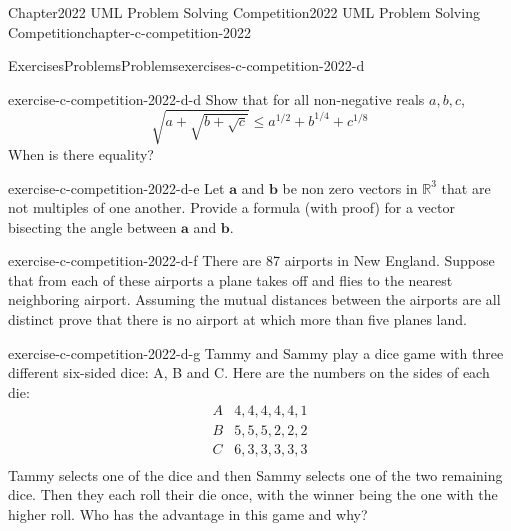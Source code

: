 \documentclass[oneside,10pt,]{book}
\numberwithin{equation}{section}
\providecommand\phantomsection{}
\newcommand{\RR}{\mathbb{R}}
\renewcommand{\vec}[1]{\mathbf{#1}}
\begin{document}
\begin{chapterptx}{Chapter}{2022 UML Problem Solving Competition}{}{2022 UML Problem Solving Competition}{}{}{chapter-c-competition-2022}
\begin{exercises-section}{Exercises}{Problems}{}{Problems}{}{}{exercises-c-competition-2022-d}
\begin{divisionexercise}{3}{}{}{exercise-c-competition-2022-d-d}
Show that for all non-negative reals \(a, b, c\),%
\begin{equation*}
\sqrt{a + \sqrt{b + \sqrt{c}}} \leq a^{1/2}+ b^{1/4} + c^{1/8}
\end{equation*}
When is there equality?%
\end{divisionexercise}%
\begin{divisionexercise}{4}{}{}{exercise-c-competition-2022-d-e}%
Let \(\vec{a}\) and  \(\vec{b}\)  be non zero vectors in \(\RR^3\) that are not multiples of one another. Provide a formula (with proof) for a vector bisecting the angle between \(\vec{a}\) and \(\vec{b}\).%
\end{divisionexercise}%
\begin{divisionexercise}{5}{}{}{exercise-c-competition-2022-d-f}%
There are 87 airports in New England. Suppose that from each of these airports a plane takes off and flies to the nearest neighboring airport. Assuming the mutual distances between the airports are all distinct prove that there is no airport at which more than five planes land.%
\end{divisionexercise}%
\begin{divisionexercise}{6}{}{}{exercise-c-competition-2022-d-g}%
Tammy and Sammy play a dice game with three different six-sided dice: A, B and C. Here are the numbers on the sides of each die:%
\begin{equation*}
\begin{array}{cc}
A & 4, 4, 4, 4, 4, 1 \\
B & 5, 5, 5, 2, 2, 2 \\
C & 6, 3, 3, 3, 3, 3 \\
\end{array}
\end{equation*}
Tammy selects one of the dice and then Sammy selects one of the two remaining dice.  Then they each roll their die once, with the winner being the one with the higher roll.   Who has the advantage in this game and why?%
\end{divisionexercise}%
\end{exercises-section}
\end{chapterptx}
%
\appendix%
%
\clearpage\phantomsection%
%
%
%
\typeout{************************************************}
\typeout{************************************************}
%
\end{document}
